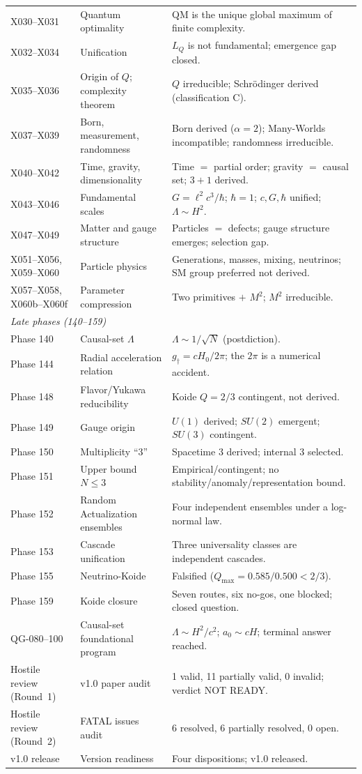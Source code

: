 \documentclass[10pt,twoside,openany]{book}
\begin{document}
\begin{longtable}{p{4.2cm}p{5.2cm}p{5.6cm}}
X030--X031 & Quantum optimality & QM is the unique global maximum of finite complexity. \\
X032--X034 & Unification & $L_Q$ is not fundamental; emergence gap closed. \\
X035--X036 & Origin of $Q$; complexity theorem & $Q$ irreducible; Schr\"odinger derived (classification C). \\
X037--X039 & Born, measurement, randomness & Born derived ($\alpha=2$); Many-Worlds incompatible; randomness irreducible. \\
X040--X042 & Time, gravity, dimensionality & Time $=$ partial order; gravity $=$ causal set; $3{+}1$ derived. \\
X043--X046 & Fundamental scales & $G=\ell^2c^3/\hbar$; $\hbar=1$; $c,G,\hbar$ unified; $\Lambda\sim H^2$. \\
X047--X049 & Matter and gauge structure & Particles $=$ defects; gauge structure emerges; selection gap. \\
X051--X056, X059--X060 & Particle physics & Generations, masses, mixing, neutrinos; SM group preferred not derived. \\
X057--X058, X060b--X060f & Parameter compression & Two primitives $+$ $M^2$; $M^2$ irreducible. \\
\midrule
\multicolumn{3}{l}{\emph{Late phases (140--159)}} \\
\midrule
Phase 140 & Causal-set $\Lambda$ & $\Lambda\sim1/\sqrt N$ (postdiction). \\
Phase 144 & Radial acceleration relation & $g_\dagger=cH_0/2\pi$; the $2\pi$ is a numerical accident. \\
Phase 148 & Flavor/Yukawa reducibility & Koide $Q=2/3$ contingent, not derived. \\
Phase 149 & Gauge origin & $U(1)$ derived; $SU(2)$ emergent; $SU(3)$ contingent. \\
Phase 150 & Multiplicity ``3'' & Spacetime 3 derived; internal 3 selected. \\
Phase 151 & Upper bound $N\le3$ & Empirical/contingent; no stability/anomaly/representation bound. \\
Phase 152 & Random Actualization ensembles & Four independent ensembles under a log-normal law. \\
Phase 153 & Cascade unification & Three universality classes are independent cascades. \\
Phase 155 & Neutrino-Koide & Falsified ($Q_{\max}=0.585/0.500<2/3$). \\
Phase 159 & Koide closure & Seven routes, six no-gos, one blocked; closed question. \\
QG-080--100 & Causal-set foundational program & $\Lambda\sim H^2/c^2$; $a_0\sim cH$; terminal answer reached. \\
Hostile review (Round~1) & v1.0 paper audit & 1 valid, 11 partially valid, 0 invalid; verdict NOT READY. \\
Hostile review (Round~2) & FATAL issues audit & 6 resolved, 6 partially resolved, 0 open. \\
v1.0 release & Version readiness & Four dispositions; v1.0 released. \\
\bottomrule
\end{longtable}
\end{document}
